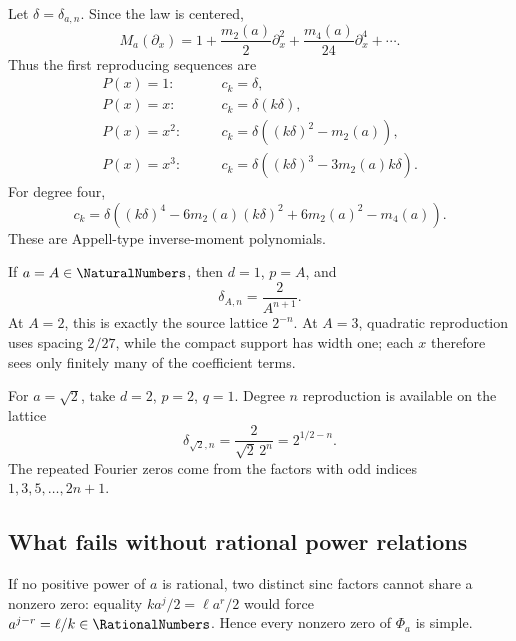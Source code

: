 \documentclass[11pt,oneside]{article}
\numberwithin{equation}{section}
\theoremstyle{definition}
\theoremstyle{remark}
\begin{document}
Let $\delta=\delta_{a,n}$.  Since the law is centered,
\[
 M_a(\partial_x)=1+\frac{m_2(a)}{2}\partial_x^2+\frac{m_4(a)}{24}\partial_x^4+\cdots.
\]
Thus the first reproducing sequences are
\begin{align}
 P(x)=1:&\qquad c_k=\delta,\label{p6:eq:reproduce-1}\\
 P(x)=x:&\qquad c_k=\delta(k\delta),\label{p6:eq:reproduce-x}\\
 P(x)=x^2:&\qquad
 c_k=\delta\left((k\delta)^2-m_2(a)\right),\label{p6:eq:reproduce-x2}\\
 P(x)=x^3:&\qquad
 c_k=\delta\left((k\delta)^3-3m_2(a)k\delta\right).
 \label{p6:eq:reproduce-x3}
\end{align}
For degree four,
\begin{equation}\label{p6:eq:reproduce-x4}
 c_k=\delta\left((k\delta)^4-6m_2(a)(k\delta)^2
 +6m_2(a)^2-m_4(a)\right).
\end{equation}
These are Appell-type inverse-moment polynomials.

\begin{example}
If $a=A\in\NaturalNumbers$, then $d=1$, $p=A$, and
\begin{equation}\label{p6:eq:integer-lattice}
 \delta_{A,n}=\frac{2}{A^{n+1}}.
\end{equation}
At $A=2$, this is exactly the source lattice $2^{-n}$.  At $A=3$, quadratic
reproduction uses spacing $2/27$, while the compact support has width one; each
$x$ therefore sees only finitely many of the coefficient terms.
\end{example}

\begin{example}
For $a=\sqrt2$, take $d=2$, $p=2$, $q=1$.  Degree $n$ reproduction is available
on the lattice
\[
 \delta_{\sqrt2,n}=\frac{2}{\sqrt2\,2^n}=2^{1/2-n}.
\]
The repeated Fourier zeros come from the factors with odd indices
$1,3,5,\ldots,2n+1$.
\end{example}

\subsection{What fails without rational power relations}

If no positive power of $a$ is rational, two distinct sinc factors cannot share
a nonzero zero: equality
$ka^j/2=\ell a^r/2$ would force $a^{j-r}=\ell/k\in\RationalNumbers$.  Hence every nonzero
zero of $\Phi_a$ is simple.
\end{document}
